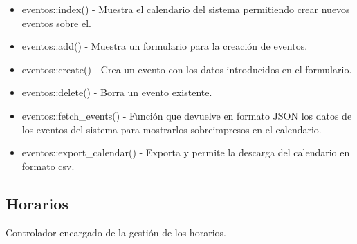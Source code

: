 \begin{itemize}
\item eventos::index() - Muestra el calendario del sistema permitiendo crear nuevos eventos sobre el.
\item eventos::add() - Muestra un formulario para la creación de eventos.
\item eventos::create() - Crea un evento con los datos introducidos en el formulario.
\item eventos::delete() - Borra un evento existente.
\item eventos::fetch\_events() - Función que devuelve en formato JSON los datos de los eventos del sistema para mostrarlos sobreimpresos en el calendario.
\item eventos::export\_calendar() - Exporta y permite la descarga del calendario en formato csv.
\end{itemize}

\subsection{Horarios}

Controlador encargado de la gestión de los horarios.

